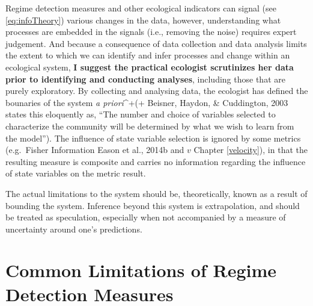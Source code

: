 \documentclass[12pt,twoside,openany]{reedthesis}
\begin{document}
Regime detection measures and other ecological indicators can signal (see \eqref{eq:infoTheory}) various changes in the data, however, understanding what processes are embedded in the signals (i.e., removing the noise) requires expert judgement. And because a consequence of data collection and data analysis limits the extent to which we can identify and infer processes and change within an ecological system, \textbf{I suggest the practical ecologist scrutinizes her data prior to identifying and conducting analyses}, including those that are purely exploratory. By collecting and analysing data, the ecologist has defined the bounaries of the system \emph{a priori}\^{}+(+ Beisner, Haydon, \& Cuddington, 2003 states this eloquently as, ``The number and choice of variables selected to characterize the community will be determined by what we wish to learn from the model''). The influence of state variable selection is ignored by some metrics (e.g.~Fisher Information Eason et al., 2014b and \(v\) Chapter \ref{velocity}), in that the resulting measure is composite and carries no information regarding the influence of state variables on the metric result.

The actual limitations to the system should be, theoretically, known as a result of bounding the system. Inference beyond this system is extrapolation, and should be treated as speculation, especially when not accompanied by a measure of uncertainty around one's predictions.

\hypertarget{common-limitations-of-regime-detection-measures}{%
\section{Common Limitations of Regime Detection Measures}\label{common-limitations-of-regime-detection-measures}}
\end{document}
